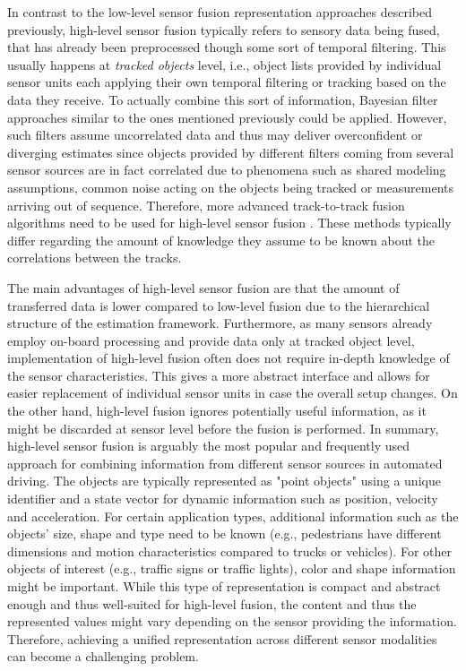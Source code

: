 In contrast to the low-level sensor fusion representation approaches described previously, high-level sensor fusion typically refers to sensory data being fused, that has already been preprocessed though some sort of temporal filtering.
This usually happens at \emph{tracked objects} level, i.e., object lists provided by individual sensor units each applying their own temporal filtering or tracking based on the data they receive.
To actually combine this sort of information, Bayesian filter approaches similar to the ones mentioned previously could be applied. 
However, such filters assume uncorrelated data and thus may deliver overconfident or diverging estimates since objects provided by different filters coming from several sensor sources are in fact correlated due to phenomena such as shared modeling assumptions, common noise acting on the objects being tracked or measurements arriving out of sequence.
Therefore, more advanced track-to-track fusion algorithms need to be used for high-level sensor fusion \parencite{Tian2010, Aeberhard2012}.
These methods typically differ regarding the amount of knowledge they assume to be known about the correlations between the tracks.

The main advantages of high-level sensor fusion are that the amount of transferred data is lower compared to low-level fusion due to the hierarchical structure of the estimation framework.
Furthermore, as many sensors already employ on-board processing and provide data only at tracked object level, implementation of high-level fusion often does not require in-depth knowledge of the sensor characteristics.
This gives a more abstract interface and allows for easier replacement of individual sensor units in case the overall setup changes.
On the other hand, high-level fusion ignores potentially useful information, as it might be discarded at sensor level before the fusion is performed.
In summary, high-level sensor fusion is arguably the most popular and frequently used approach for combining information from different sensor sources in automated driving.
The objects are typically represented as "point objects" using a unique identifier and a state vector for dynamic information such as position, velocity and acceleration.
For certain application types, additional information such as the objects' size, shape and type need to be known (e.g., pedestrians have different dimensions and motion characteristics compared to trucks or vehicles).
For other objects of interest (e.g., traffic signs or traffic lights), color and shape information might be important.
While this type of representation is compact and abstract enough and thus well-suited for high-level fusion, the content and thus the represented values might vary depending on the sensor providing the information.
Therefore, achieving a unified representation across different sensor modalities can become a challenging problem.

